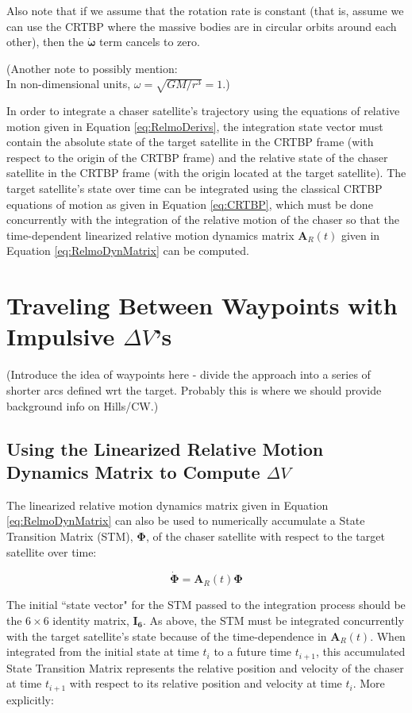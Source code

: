 \documentclass[a4paper]{article}
\begin{document}
Also note that if we assume that the rotation rate is constant (that is, assume we can use the CRTBP where the massive bodies are in circular orbits around each other), then the \(\boldsymbol{\dot{\omega}}\) term cancels to zero.

(Another note to possibly mention: \\ In non-dimensional units, \(\omega = \sqrt{GM/r^3} = 1\).)

In order to integrate a chaser satellite's trajectory using the equations of relative motion given in Equation \ref{eq:RelmoDerivs}, the integration state vector must contain the absolute state of the target satellite in the CRTBP frame (with respect to the origin of the CRTBP frame) and the relative state of the chaser satellite in the CRTBP frame (with the origin located at the target satellite).  The target satellite's state over time can be integrated using the classical CRTBP equations of motion as given in Equation \ref{eq:CRTBP}, which must be done concurrently with the integration of the relative motion of the chaser so that the time-dependent linearized relative motion dynamics matrix \(\mathbf{A}_R(t)\) given in Equation \ref{eq:RelmoDynMatrix} can be computed.

\section{Traveling Between Waypoints with Impulsive \(\Delta V\)'s}

(Introduce the idea of waypoints here - divide the approach into a series of shorter arcs defined wrt the target.  Probably this is where we should provide background info on Hills/CW.)

\subsection{Using the Linearized Relative Motion Dynamics Matrix to Compute \(\Delta V\)}

The linearized relative motion dynamics matrix given in Equation \ref{eq:RelmoDynMatrix} can also be used to numerically accumulate a State Transition Matrix (STM), \(\boldsymbol{\Phi}\), of the chaser satellite with respect to the target satellite over time:

\begin{equation} \label{eq:STM}
\dot{\boldsymbol{\Phi}} = \mathbf{A}_R(t)\boldsymbol{\Phi}
\end{equation}

The initial ``state vector" for the STM passed to the integration process should be the \(6\times6\) identity matrix, \(\mathbf{I_6}\).  As above, the STM must be integrated concurrently with the target satellite's state because of the time-dependence in \(\mathbf{A}_R(t)\).  When integrated from the initial state at time \(t_i\) to a future time \(t_{i+1}\), this accumulated State Transition Matrix represents the relative position and velocity of the chaser at time \(t_{i+1}\) with respect to its relative position and velocity at time \(t_i\).  More explicitly:
\end{document}
